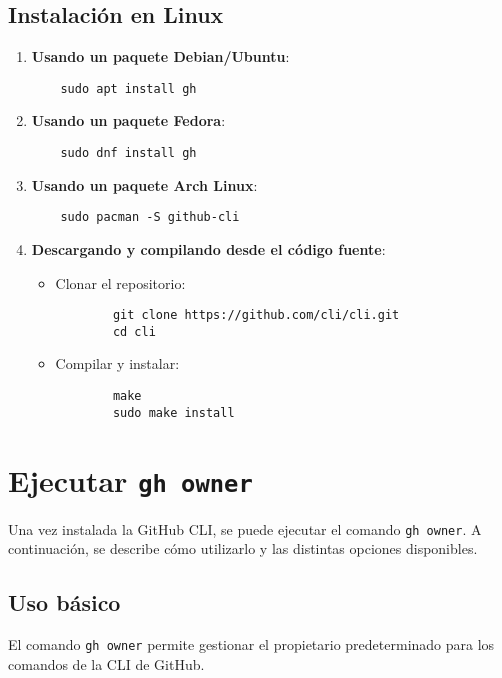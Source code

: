\subsection{Instalación en Linux}

\begin{enumerate}
    \item \textbf{Usando un paquete Debian/Ubuntu}:
    \begin{verbatim}
    sudo apt install gh
    \end{verbatim}
    \item \textbf{Usando un paquete Fedora}:
    \begin{verbatim}
    sudo dnf install gh
    \end{verbatim}
    \item \textbf{Usando un paquete Arch Linux}:
    \begin{verbatim}
    sudo pacman -S github-cli
    \end{verbatim}
    \item \textbf{Descargando y compilando desde el código fuente}:
    \begin{itemize}
        \item Clonar el repositorio:
        \begin{verbatim}
        git clone https://github.com/cli/cli.git
        cd cli
        \end{verbatim}
        \item Compilar y instalar:
        \begin{verbatim}
        make
        sudo make install
        \end{verbatim}
    \end{itemize}
\end{enumerate}

\section{Ejecutar \texttt{gh owner}}

Una vez instalada la GitHub CLI, se puede ejecutar el comando \texttt{gh owner}. A continuación, se describe cómo utilizarlo y las distintas opciones disponibles.

\subsection{Uso básico}

El comando \texttt{gh owner} permite gestionar el propietario predeterminado para los comandos de la CLI de GitHub.

